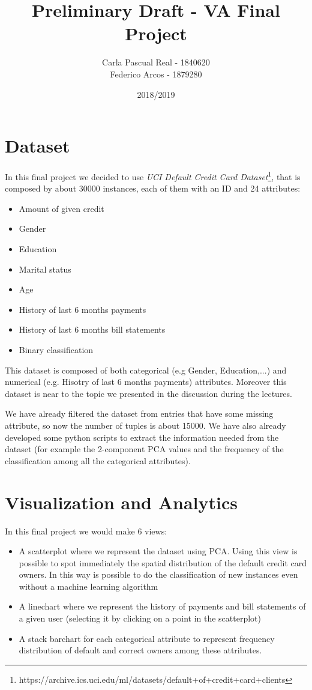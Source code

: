 \documentclass{article}
\title{Preliminary Draft - VA Final Project}
\author{Carla Pascual Real - 1840620\\
Federico Arcos - 1879280}
\date{2018/2019}
\begin{document}
\maketitle
\section{Dataset}

In this final project we decided to use \textit{UCI Default Credit Card Dataset}\footnote{https://archive.ics.uci.edu/ml/datasets/default+of+credit+card+clients}, that is composed by about 30000 instances, each of them with an ID and 24 attributes:
\begin{itemize}
  \item Amount of given credit
  \item Gender
  \item Education
  \item Marital status
  \item Age
  \item History of last 6 months payments
  \item History of last 6 months bill statements
  \item Binary classification
\end{itemize}

This dataset is composed of both categorical (e.g Gender, Education,...) and numerical (e.g. Hisotry of last 6 months payments) attributes. Moreover this dataset is near to the topic we presented in the discussion during the lectures.

We have already filtered the dataset from entries that have some missing attribute, so now the number of tuples is about 15000. We have also already developed some python scripts to extract the information needed from the dataset (for example the 2-component PCA
values and the frequency of the classification among all the categorical attributes).

\section{Visualization and Analytics}

In this final project we would make 6 views:
\begin{itemize}
  \item A scatterplot where we represent the dataset using PCA. Using this view is possible to spot immediately the spatial distribution of the default credit card owners. In this way is possible to do the classification of new instances even without a machine learning algorithm
  \item A linechart where we represent the history of payments and bill statements of a given user (selecting it by clicking on a point in the scatterplot)
  \item A stack barchart for each categorical attribute to represent frequency distribution of default and correct owners among these attributes.
\end{itemize}
\end{document}
